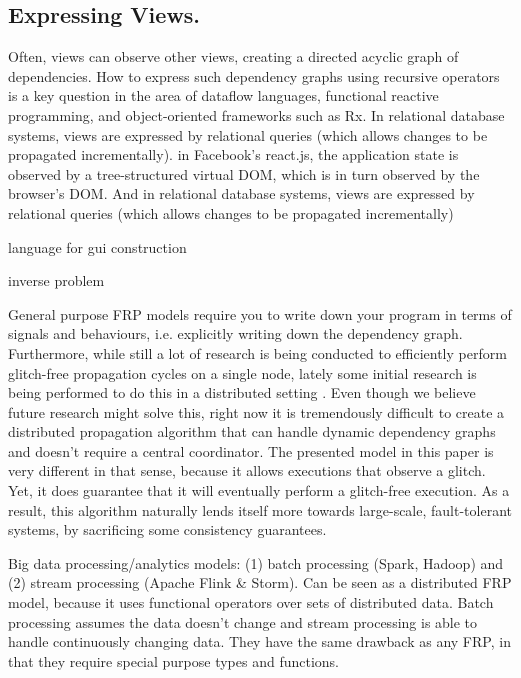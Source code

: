 \subsection{Expressing Views.} Often, views can observe other views, creating a directed acyclic graph of dependencies. How to express such dependency graphs using recursive operators is a key question in the area of dataflow languages, functional reactive programming, and object-oriented frameworks such as Rx. In relational database systems, views are expressed by relational queries (which allows changes to be propagated incrementally). in Facebook's react.js, the application state is observed by a tree-structured virtual DOM, which is in turn observed by the browser's DOM. And in relational database systems, views are expressed by relational queries (which allows changes to be propagated incrementally)

 


 
 
\cite{burckhardt-leijen-yi-sadowski-ball-OOPSLA11}
\cite{camil}


\cite{alive}
\cite{react}

\cite{elm} language for gui construction

\cite{statelines} inverse problem




General purpose FRP models \cite{reactivesurvey} require you to write down your program in terms of signals and behaviours, i.e. explicitly writing down the dependency graph. Furthermore, while still a lot of research is being conducted to efficiently perform glitch-free propagation cycles on a single node, lately some initial research is being performed to do this in a distributed setting \cite{elm}\cite{drescala}. Even though we believe future research might solve this, right now it is tremendously difficult to create a distributed propagation algorithm that can handle dynamic dependency graphs and doesn't require a central coordinator. The presented model in this paper is very different in that sense, because it allows executions that observe a glitch. Yet, it does guarantee that it will eventually perform a glitch-free execution. As a result, this algorithm naturally lends itself more towards large-scale, fault-tolerant systems, by sacrificing some consistency guarantees.


Big data processing/analytics models: (1) batch processing (Spark, Hadoop) \cite{mapreduce} and (2) stream processing (Apache Flink \& Storm). Can be seen as a  distributed FRP model, because it uses functional operators over sets of distributed data. Batch processing assumes the data doesn't change and stream processing is able to handle continuously changing data. They have the same drawback as any FRP, in that they require special purpose types and functions.

\cite{orleans}

